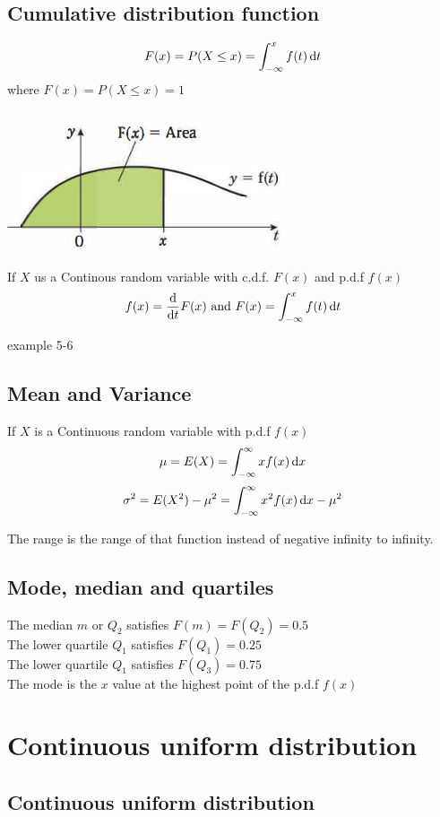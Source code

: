 \documentclass[a4paper]{article}
\begin{document}
\subsection{Cumulative distribution function}
\[
	F(x)=P(X\leq x)=\int_{-\infty}^x f(t) \, \mathrm{d} t
\]
where $F(x)=P(X\leq x)=1$
\begin{center}
	\includegraphics[scale=0.5]{img_S/11_2_intro}
\end{center}
If $X$ us a Continous random variable with c.d.f. $F(x)$ and p.d.f $f(x)$
\[
	f(x)=\frac{\mathrm{d} }{\mathrm{d} t} F(x) \mbox{~and~} F(x)=\int_{-\infty}^x f(t) \, \mathrm{d} t
\]

\begin{eg}
	example 5-6
\end{eg}
\subsection{Mean and Variance}
If $X$ is a Continuous random variable with p.d.f $f(x)$
\[
    \mu=E(X)=\int_{-\infty}^{\infty}x f(x) \, \mathrm{d} x
\]
\[
    \sigma^2=E(X^2)-\mu^2=\int_{-\infty}^{\infty}x^2 f(x) \, \mathrm{d} x-\mu^2
\]
\begin{remark}
    The range is the range of that function instead of negative infinity to infinity.
\end{remark}
\subsection{Mode, median and quartiles}
The median $m$ or $Q_2$ satisfies $F(m)=F(Q_2)=0.5$\\
The lower quartile $Q_1$ satisfies $F(Q_1)=0.25$ \\ 
The lower quartile $Q_1$ satisfies $F(Q_3)=0.75$ \\

The mode is the $x$ value at the highest point of the p.d.f $f(x)$

\section{Continuous uniform distribution}
\subsection{Continuous uniform distribution}
\end{document}
